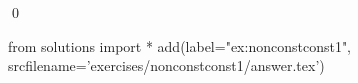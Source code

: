 
\begin{ex} 
  \label{ex:nonconstconst1}
  
  \qed
\end{ex} 
\begin{python0}
from solutions import *
add(label="ex:nonconstconst1",
    srcfilename='exercises/nonconstconst1/answer.tex') 
\end{python0}
